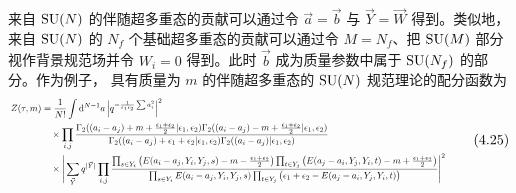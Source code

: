 

来自 $\mathrm{SU}(N)$ 的伴随超多重态的贡献可以通过令 $\vec a=\vec b$ 与 $\vec Y=\vec W$ 得到。类似地，来自 $\mathrm{SU}(N)$ 的 $N_f$ 个基础超多重态的贡献可以通过令 $M=N_f$、把 $\mathrm{SU}(M)$ 部分视作背景规范场并令 $W_i=0$ 得到。此时 $\vec b$ 成为质量参数中属于 $\mathrm{SU}(N_f)$ 的部分。作为例子，
具有质量为 $m$ 的伴随超多重态的 $\mathrm{SU}(N)$ 规范理论的配分函数为
\begin{equation}
\resizebox{0.9\textwidth}{!}{$\displaystyle
\begin{aligned}
Z(\tau,m)&=\frac{1}{N!}\int\dd^{N-1}a\,\Big|q^{-\frac{1}{\epsilon_1\epsilon_2}\sum a_i^2}\Big|^2\\
&\quad\times\prod_{i,j}\frac{\Gamma_2((a_i-a_j)+m+\frac{\epsilon_1+\epsilon_2}{2}|\epsilon_1,\epsilon_2)\Gamma_2((a_i-a_j)-m+\frac{\epsilon_1+\epsilon_2}{2}|\epsilon_1,\epsilon_2)}{\Gamma_2((a_i-a_j)+\epsilon_1+\epsilon_2|\epsilon_1,\epsilon_2)\Gamma_2((a_i-a_j)|\epsilon_1,\epsilon_2)}\\
&\quad\times\Bigg|\sum_{\vec Y}q^{|\vec Y|}\prod_{i,j}\frac{\prod_{s\in Y_i}\big(E(a_i-a_j,Y_i,Y_j,s)-m-\frac{\epsilon_1+\epsilon_2}{2}\big)\prod_{t\in Y_j}\big(E(a_j-a_i,Y_j,Y_i,t)-m+\frac{\epsilon_1+\epsilon_2}{2}\big)}{\prod_{s\in Y_i}E(a_i-a_j,Y_i,Y_j,s)\prod_{t\in Y_j}\big(\epsilon_1+\epsilon_2-E(a_j-a_i,Y_j,Y_i,t)\big)}\Bigg|^2
\end{aligned}
$}
\tag{4.25}
\end{equation}


